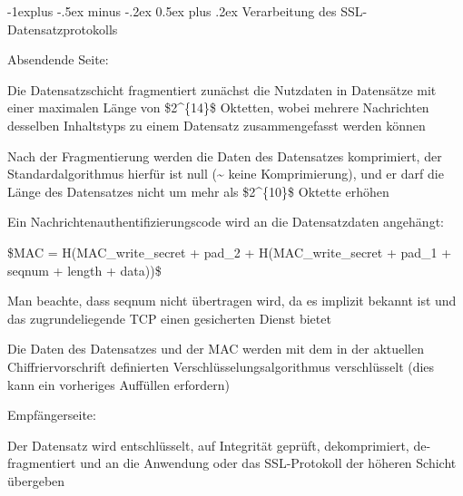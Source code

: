 \documentclass[a4paper]{article}
\makeatletter
\renewcommand{\subsection}{\@startsection{subsection}{2}{0mm}%
 {-1explus -.5ex minus -.2ex}%
 {0.5ex plus .2ex}%
 {\normalfont\normalsize\bfseries}}
\makeatother
\begin{document}
\begin{multicols}{3}
\begin{itemize*}
            \subsection{Verarbeitung des
                  SSL-Datensatzprotokolls}

            \begin{itemize*}
                  \item
                  Absendende Seite:

                  \begin{itemize*}
                        \item Die Datensatzschicht fragmentiert zunächst die Nutzdaten in Datensätze mit einer maximalen Länge von \$2\^{}\{14\}\$ Oktetten, wobei mehrere Nachrichten desselben Inhaltstyps zu einem Datensatz zusammengefasst werden können
                        \item Nach der Fragmentierung werden die Daten des Datensatzes komprimiert, der Standardalgorithmus hierfür ist null (\textasciitilde{} keine Komprimierung), und er darf die Länge des Datensatzes nicht um mehr als \$2\^{}\{10\}\$ Oktette erhöhen
                        \item Ein Nachrichtenauthentifizierungscode wird an die Datensatzdaten angehängt:
                        \begin{itemize*} \item \$MAC = H(MAC\_write\_secret + pad\_2 + H(MAC\_write\_secret + pad\_1 + seqnum + length + data))\$ \item Man beachte, dass seqnum nicht übertragen wird, da es implizit bekannt ist und das zugrundeliegende TCP einen gesicherten Dienst bietet \end{itemize*}
                        \item Die Daten des Datensatzes und der MAC werden mit dem in der aktuellen Chiffriervorschrift definierten Verschlüsselungsalgorithmus verschlüsselt (dies kann ein vorheriges Auffüllen erfordern)
                  \end{itemize*}
                  \item
                  Empfängerseite:

                  \begin{itemize*}
                        \item Der Datensatz wird entschlüsselt, auf Integrität geprüft, dekomprimiert, de-fragmentiert und an die Anwendung oder das SSL-Protokoll der höheren Schicht übergeben
                  \end{itemize*}
            \end{itemize*}



\end{itemize*}
\end{multicols}
\end{document}
